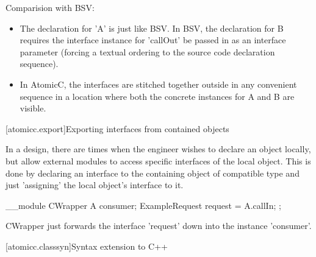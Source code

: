 Comparision with BSV:
\begin{itemize}
\item The declaration for 'A' is just like BSV.
In BSV, the declaration for B requires the interface instance for 'callOut' be passed in as
an interface parameter (forcing a textual ordering to the source code
declaration sequence).
\item In AtomicC, the interfaces are stitched together outside in any
convenient sequence in a location where both the concrete instances
for A and B are visible.
\end{itemize}

[atomicc.export]{Exporting interfaces from contained objects}

In a design, there are times when the engineer wishes to declare an object locally,
but allow external modules to access specific interfaces of the local object.
This is done by declaring an interface to the containing object of compatible
type and just 'assigning' the local object's interface to it.

\begin{example}
\begin{codeblock}
     __module CWrapper {
         A consumer;
         ExampleRequest request = A.callIn;
      };
\end{codeblock}
\end{example}

CWrapper just forwards the interface 'request' down into the instance 'consumer'.

[atomicc.classsyn]{Syntax extension to C++}
\begin{bnf}
\br
     \br
     \br
\end{bnf}
